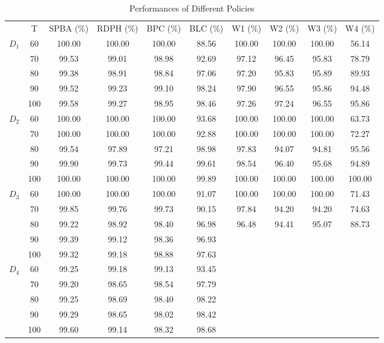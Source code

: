   \begin{table}[h]
   \centering
   \caption{Performances of Different Policies}\label{tab_perf}
   \begin{tabular}{cccccccccc}
   \hline
    & T & SPBA (\%) & RDPH (\%) & BPC (\%) & BLC (\%) & W1 (\%) & W2 (\%) & W3 (\%) & W4 (\%) \\
   \cmidrule(r){0-1} \cmidrule(lr){3-6} \cmidrule(lr){7-10} 
   \multirow{5}{*}{$D_1$} & 60 & 100.00 & 100.00 & 100.00 & 88.56 & 100.00 & 100.00 & 100.00 & 56.14  \\
   & 70    & 99.53 & 99.01 & 98.98 & 92.69  & 97.12 & 96.45 & 95.83 & 78.79 \\
   & 80    & 99.38 & 98.91 & 98.84 & 97.06  & 97.20 & 95.83 & 95.89 & 89.93 \\
   & 90    & 99.52 & 99.23 & 99.10 & 98.24  & 97.90 & 96.55 & 95.86 & 94.48 \\
   & 100   & 99.58 & 99.27 & 98.95 & 98.46  & 97.26 & 97.24 & 96.55 & 95.86 \\
   \hline
   \multirow{5}{*}{$D_2$} & 60  & 100.00 & 100.00 & 100.00 & 93.68 & 100.00 & 100.00 & 100.00 & 63.73  \\
      & 70  & 100.00 & 100.00 & 100.00 & 92.88 & 100.00 & 100.00 & 100.00 & 72.27 \\
      & 80  & 99.54 & 97.89 & 97.21 & 98.98 & 97.83 & 94.07 & 94.81 & 95.56 \\
      & 90  & 99.90 & 99.73 & 99.44 & 99.61 & 98.54 & 96.40 & 95.68 & 94.89 \\
      & 100 & 100.00 & 100.00 & 100.00 & 99.89 & 100.00 & 100.00 & 100.00 & 100.00 \\ 
   \hline
   \multirow{5}{*}{$D_3$} & 60  & 100.00 & 100.00 & 100.00 & 91.07 & 100.00 & 100.00 & 100.00 & 71.43  \\
   & 70  & 99.85 & 99.76 & 99.73 & 90.15 & 97.84 & 94.20 & 94.20 & 74.63 \\
   & 80  & 99.22 & 98.92 & 98.40 & 96.98 & 96.48 & 94.41 & 95.07 & 88.73 \\
   & 90  & 99.39 & 99.12 & 98.36 & 96.93 &  \\
   & 100  & 99.32 & 99.18 & 98.88 & 97.63  \\
     \hline
     \multirow{5}{*}{$D_4$} & 60  & 99.25 & 99.18 & 99.13 & 93.45  \\
      & 70  & 99.20 & 98.65 & 98.54 & 97.79  \\
      & 80  & 99.25 & 98.69 & 98.40 & 98.22 \\
      & 90  & 99.29 & 98.65 & 98.02 & 98.42  \\
      & 100 & 99.60 & 99.14 & 98.32 & 98.68 \\
   \hline
   \end{tabular}
 \end{table}